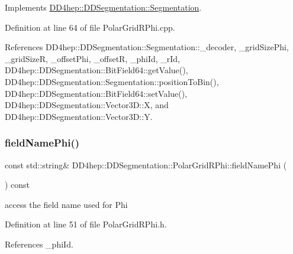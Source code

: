 Implements \hyperlink{class_d_d4hep_1_1_d_d_segmentation_1_1_segmentation_ad5a60953d96d409850d8192f64f8ce3c}{D\+D4hep\+::\+D\+D\+Segmentation\+::\+Segmentation}.



Definition at line 64 of file Polar\+Grid\+R\+Phi.\+cpp.



References D\+D4hep\+::\+D\+D\+Segmentation\+::\+Segmentation\+::\+\_\+decoder, \+\_\+grid\+Size\+Phi, \+\_\+grid\+SizeR, \+\_\+offset\+Phi, \+\_\+offsetR, \+\_\+phi\+Id, \+\_\+r\+Id, D\+D4hep\+::\+D\+D\+Segmentation\+::\+Bit\+Field64\+::get\+Value(), D\+D4hep\+::\+D\+D\+Segmentation\+::\+Segmentation\+::position\+To\+Bin(), D\+D4hep\+::\+D\+D\+Segmentation\+::\+Bit\+Field64\+::set\+Value(), D\+D4hep\+::\+D\+D\+Segmentation\+::\+Vector3\+D\+::X, and D\+D4hep\+::\+D\+D\+Segmentation\+::\+Vector3\+D\+::Y.

\hypertarget{class_d_d4hep_1_1_d_d_segmentation_1_1_polar_grid_r_phi_a70e45f77d55dec9166dbe93ade4ec29e}{}\label{class_d_d4hep_1_1_d_d_segmentation_1_1_polar_grid_r_phi_a70e45f77d55dec9166dbe93ade4ec29e} 
\subsubsection{\texorpdfstring{field\+Name\+Phi()}{fieldNamePhi()}}
{\footnotesize\ttfamily const std\+::string\& D\+D4hep\+::\+D\+D\+Segmentation\+::\+Polar\+Grid\+R\+Phi\+::field\+Name\+Phi (\begin{DoxyParamCaption}{ }\end{DoxyParamCaption}) const\hspace{0.3cm}{\ttfamily [inline]}}



access the field name used for Phi 



Definition at line 51 of file Polar\+Grid\+R\+Phi.\+h.



References \+\_\+phi\+Id.

\hypertarget{class_d_d4hep_1_1_d_d_segmentation_1_1_polar_grid_r_phi_a5d523c6212aa4154ae4f4ee4e3f8baab}{}\label{class_d_d4hep_1_1_d_d_segmentation_1_1_polar_grid_r_phi_a5d523c6212aa4154ae4f4ee4e3f8baab} 
